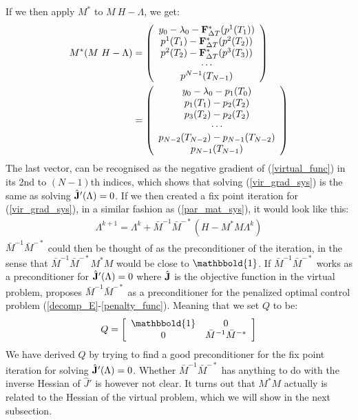 If we then apply $M^*$ to $M \ H-\Lambda$, we get:
\begin{align}
M^* (M \ H-\Lambda)&=
	\left( \begin{array}{c}
	y_0-\lambda_0 -\bold{F}_{\Delta T}^*(p^1(T_1))\\
	 p^1(T_1)-\bold{F}_{\Delta T}^*(p^2( T_2))\\
	p^2( T_2)-\bold{F}_{\Delta T}^*(p^3( T_3))\\
	\cdots \\
	p^{N-1}(T_{N-1})
	\end{array} \right)
	\\
	&=\left( \begin{array}{c}
	y_0-\lambda_0 - p_1(T_0)\\
	p_1(T_1)-p_2(T_2)\\
	p_3(T_2)-p_2(T_2)\\
	\cdots \\
	p_{N-2}(T_{N-2})-p_{N-1}(T_{N-2}) \\
	p_{N-1}(T_{N-1})
	\end{array} \right)
\end{align}
The last vector, can be recognised as the negative gradient of (\ref{virtual_func}) in its 2nd to $(N-1)$th indices, which shows that solving (\ref{vir_grad_sys}) is the same as solving $\hat {\bold J}'(\Lambda)=0$. If we then created a fix point iteration for (\ref{vir_grad_sys}), in a similar fashion as (\ref{par_mat_sys}), it would look like this:
\begin{align*}
\Lambda^{k+1} = \Lambda^k + \bar{M}^{-1}\bar M^{-*}(H-M^*M\Lambda^k)
\end{align*}
$\bar{M}^{-1}\bar{M}^{-*}$ could then be thought of as the preconditioner of the iteration, in the sense that $\bar{M}^{-1}\bar{M}^{-*}M^*M$ would be close to $\mathbbold{1}$. If $\bar{M}^{-1}\bar{M}^{-*}$ works as a preconditioner for  $\hat {\bold J}'(\Lambda)=0$ where $\hat {\bold J}$ is the objective function in the virtual problem, \cite{maday2002parareal} proposes $\bar{M}^{-1}\bar{M}^{-*}$ as a preconditioner for the penalized optimal control problem (\ref{decomp_E}-\ref{penalty_func}). Meaning that we set $Q$ to be:
\begin{align}
Q = \left[ \begin{array}{cc}
	\mathbbold{1} & 0 \\
	0 &  \bar{M}^{-1}\bar{M}^{-*}\\
	\end{array} \right] \label{Q_PC}
\end{align}  
We have derived $Q$ by trying to find a good preconditioner for the fix point iteration for solving $\hat {\bold J}'(\Lambda)=0$. Whether $\bar{M}^{-1}\bar{M}^{-*}$ has anything to do with the inverse Hessian of $\hat J'$ is however not clear. It turns out that $M^*M$ actually is related to the Hessian of the virtual problem, which we will show in the next subsection.
